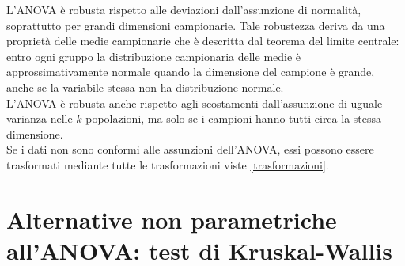 \documentclass[10pt, draft]{book}
\begin{document}
L'ANOVA è robusta rispetto alle deviazioni dall'assunzione di normalità, soprattutto per grandi dimensioni campionarie. Tale robustezza deriva da una proprietà delle medie campionarie che è descritta dal teorema del limite centrale: entro ogni gruppo la distribuzione campionaria delle medie è approssimativamente normale quando la dimensione del campione è grande, anche se la variabile stessa non ha distribuzione normale.\\
L'ANOVA è robusta anche rispetto agli scostamenti dall'assunzione di uguale varianza nelle $k$ popolazioni, ma solo se i campioni hanno tutti circa la stessa dimensione.\\

Se i dati non sono conformi alle assunzioni dell'ANOVA, essi possono essere trasformati mediante tutte le trasformazioni viste \ref{trasformazioni}.

\section{Alternative non parametriche all'ANOVA: test di Kruskal-Wallis}
\end{document}
